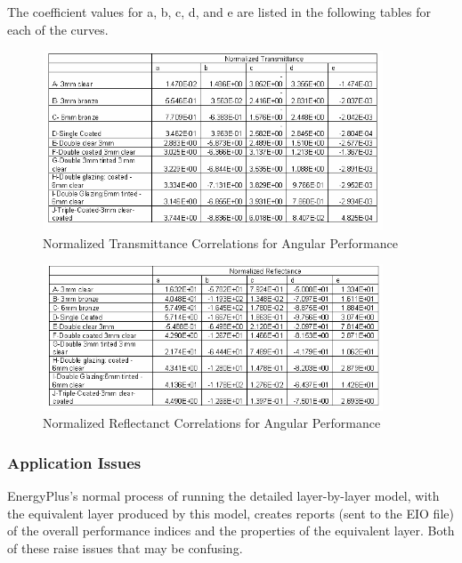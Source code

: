 The coefficient values for a, b, c, d, and e are listed in the following tables for each of the curves.

\begin{figure}[hbtp] %
\centering
\includegraphics[width=0.9\textwidth, height=0.9\textheight, keepaspectratio=true]{media/image950.png}
\caption{Normalized Transmittance Correlations for Angular Performance \protect \label{fig:normalized-transmittance-correlations-for}}
\end{figure}

\begin{figure}[hbtp] %
\centering
\includegraphics[width=0.9\textwidth, height=0.9\textheight, keepaspectratio=true]{media/image951.png}
\caption{Normalized Reflectanct Correlations for Angular Performance \protect \label{fig:normalized-reflectanct-correlations-for}}
\end{figure}

\subsubsection{Application Issues}\label{application-issues}

EnergyPlus's normal process of running the detailed layer-by-layer model, with the equivalent layer produced by this model, creates reports (sent to the EIO file) of the overall performance indices and the properties of the equivalent layer. Both of these raise issues that may be confusing.

